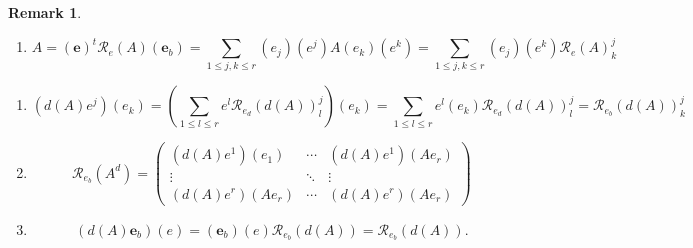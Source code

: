 \documentclass[aps,preprint]{revtex4}
\newtheorem{remark}[theorem]{Remark}
\begin{document}
\begin{remark}
\begin{enumerate}
\begin{enumerate}
\item 
\begin{equation}
A=\left( \boldsymbol{e}\right) ^{t}\mathcal{R}_{e}\left( A\right) \left( 
\boldsymbol{e}_{b}\right) =\sum_{1\leq j,k\leq r}\left( e_{j}\right) \left(
e^{j}\right) A\left( e_{k}\right) \left( e^{k}\right) =\sum_{1\leq j,k\leq
r}\left( e_{j}\right) \left( e^{k}\right) \mathcal{R}_{e}\left( A\right)
_{k}^{j}
\end{equation}
\end{enumerate}

\begin{enumerate}
\item 
\begin{equation}
\left( d\left( A\right) e^{j}\right) \left( e_{k}\right) =\left( \sum_{1\leq
l\leq r}e^{l}\mathcal{R}_{e_{d}}\left( d\left( A\right) \right)
_{l}^{j}\right) \left( e_{k}\right) =\sum_{1\leq l\leq r}e^{l}\left(
e_{k}\right) \mathcal{R}_{e_{d}}\left( d\left( A\right) \right) _{l}^{j}=%
\mathcal{R}_{e_{b}}\left( d\left( A\right) \right) _{k}^{j}
\end{equation}

\item 
\begin{equation}
\mathcal{R}_{e_{b}}\left( A^{d}\right) =\left( 
\begin{array}{ccc}
\left( d\left( A\right) e^{1}\right) \left( e_{1}\right) & \cdots & \left(
d\left( A\right) e^{1}\right) \left( Ae_{r}\right) \\ 
\vdots & \ddots & \vdots \\ 
\left( d\left( A\right) e^{r}\right) \left( Ae_{r}\right) & \cdots & \left(
d\left( A\right) e^{r}\right) \left( Ae_{r}\right)%
\end{array}%
\right)
\end{equation}

\item 
\begin{equation}
\left( d\left( A\right) \boldsymbol{e}_{b}\right) \left( e\right) =\left( 
\boldsymbol{e}_{b}\right) \left( e\right) \mathcal{R}_{e_{b}}\left( d\left(
A\right) \right) =\mathcal{R}_{e_{b}}\left( d\left( A\right) \right) .
\end{equation}


\end{enumerate}
\end{enumerate}
\end{remark}
\end{document}
